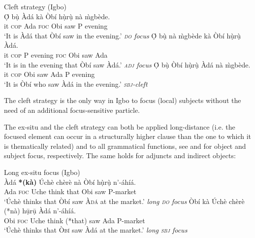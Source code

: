 \documentclass[output=paper,colorlinks,citecolor=brown]{langscibook}
\begin{document}
\ea%
    \label{ex:amaechi:6}
    Cleft strategy (Igbo)\\
    \ea\label{ex:amaechi:6a}
    \gll    Ọ́ bụ̀ Àdá kà Òbí hụ̀rụ̀ nà {\`m}gbède.\\
            it \textsc{cop} Ada \textsc{foc} Obi saw P evening\\
    \glt    `It is Àdá that Òbí saw in the evening.' \hfill\textit{{\textsc{do} focus}}
    \ex\label{ex:amaechi:6b}
    \gll    Ọ́ bụ̀ nà {\`m}gbède kà Òbí hụ̀rụ̀ Àdá.\\
            it \textsc{cop} P evening \textsc{foc} Obi saw Ada\\
    \glt    `It is in the evening that Òbí saw Àdá.' \hfill\textit{{\textsc{adj}  focus}}
    \ex\label{ex:amaechi:6c}
    \gll    Ọ́ bụ̀ Òbí hụ̀rụ̀ Àdá nà {\`m}gbède.\\
            it \textsc{cop} Obi saw Ada P evening\\
    \glt    `It is Òbí who saw Àdá in the evening.' \hfill\textit{{\textsc{sbj}-cleft}}
    \z
\z

The cleft strategy is the only way in Igbo to focus (local) subjects without the need of an additional focus-sensitive particle.

The ex-situ and the cleft strategy can both be applied long-distance (i.e. the focused element can occur in a structurally higher clause than the one to which it is thematically related) and to all grammatical functions, see  and  for object and subject focus, respectively. The same holds for adjuncts and indirect objects:

\ea%
    \label{ex:amaechi:7}
    Long ex-situ focus (Igbo)\\
    \ea\label{ex:amaechi:7a}
    \gll    Àdá \textbf{*(kà)} Úchè chèrè nà Òbí hụ̀rụ̀ {\longrule} n'-áhíá.\\
            Ada \textsc{foc} Uche think that Obi saw {} P-market\\
    \glt    `Úchè thinks that Òbí saw \textsc{Àdá} at the market.' \hfill\textit{{\small long \textsc{do} focus}}
    \ex\label{ex:amaechi:7b}
    \gll    Òbí kà Úchè chèrè (*nà) {\longrule} hụ̄rụ̄ Àdá n'-áhíá.\\
            Obi \textsc{foc} Uche think (*that) {} saw Ada  P-market\\
    \glt    `Úchè thinks that \textsc{Òbí} saw Àdá at the market.' \hfill\textit{{\small long \textsc{sbj} focus}}
    \z
\z
\end{document}
